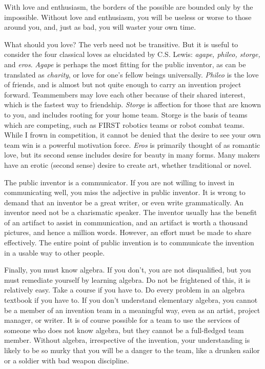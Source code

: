 \documentclass[
	fontsize=10pt, %
	twoside=false, %
	secnumdepth=1, %
]{kaobook}
\begin{document}
With love and enthusiasm, the borders of the
possible are bounded only by the impossible.
Without love and enthusiasm, you will be useless
or worse to those around you, and, just as bad,
you will waster your own time.

What should you love? The verb need not be
transitive. But it is useful to consider
the four classical loves as elucidated by C.S. Lewis:
{\em agape, phileo, storge,} and {\em eros}.\cite{Lewis1960}
{\em Agape} is perhaps the most fitting for
the public inventor, as can be translated as {\em charity},
or love for one's fellow beings universally.
{\em Phileo} is the love of friends, and
is almost but not quite enough to carry an invention project forward.
Teammembers may love each other because of their
shared interest, which is the fastest way to friendship.
{\em Storge} is affection for those that are known to you,
and includes rooting for your home team.
Storge is the basis of teams which are competing, such
as FIRST robotics teams or robot combat teams.
While I frown in competition, it cannot be denied that
the desire to see your own team win is a powerful motivation force.
{\em Eros} is primarily thought of as romantic love, but
its second sense includes desire for beauty in many forms.
Many makers have an erotic (second sense) desire
to create art, whether traditional or novel.

The public inventor is a communicator.
If you are not willing to invest in communicating well,
you miss the adjective in public inventor.
It is wrong to demand that an inventor be a great writer,
or even write grammatically.
An inventor need not be a charismatic speaker.
The inventor usually has the benefit of an artifact to assist
in communication, and an artifact is worth a thousand pictures,
and hence a million words.
However, an effort must be made to share effectively.
The entire point of public invention is to communicate the invention
in a usable way to other people.

Finally, you must know algebra.
If you don't, you are not disqualified,
but you must remediate yourself by learning algebra.
Do not be frightened of this, it is relatively easy.
Take a course if you have to.
Do every problem in an algebra textbook if you have to.
If you don't understand elementary algebra, you
cannot be a member of an invention team in a meaningful way, even as an artist,
project manager, or writer.
It is of course possible for a team to use the services of
someone who does not know algebra, but they cannot be a full-fledged
team member.
Without algebra, irrespective of the invention, your understanding
is likely to be so murky that you will be a danger to the team,
like a drunken sailor or a soldier with bad weapon discipline.\cite{Moses2001}
\end{document}
